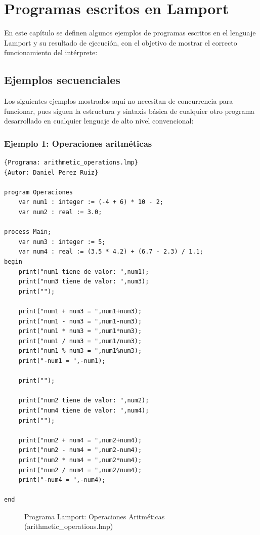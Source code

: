 \chapter{Programas escritos en Lamport}
En este capítulo se definen algunos ejemplos de programas escritos en el lenguaje Lamport y su resultado de ejecución, con el objetivo de mostrar el correcto funcionamiento del intérprete:

\section{Ejemplos secuenciales}
Los siguientes ejemplos mostrados aquí no necesitan de concurrencia para funcionar, pues siguen la estructura y sintaxis básica de cualquier otro programa desarrollado en cualquier lenguaje de alto nivel convencional:

\subsection{Ejemplo 1: Operaciones aritméticas}
\begin{lstlisting}[style=lamportStyle]
{Programa: arithmetic_operations.lmp}
{Autor: Daniel Perez Ruiz}

program Operaciones
	var num1 : integer := (-4 + 6) * 10 - 2;
	var num2 : real := 3.0;

process Main;
	var num3 : integer := 5;
	var num4 : real := (3.5 * 4.2) + (6.7 - 2.3) / 1.1;
begin
	print("num1 tiene de valor: ",num1);
	print("num3 tiene de valor: ",num3);
	print("");
	
	print("num1 + num3 = ",num1+num3);
	print("num1 - num3 = ",num1-num3);
	print("num1 * num3 = ",num1*num3);
	print("num1 / num3 = ",num1/num3);
	print("num1 % num3 = ",num1%num3);
	print("-num1 = ",-num1);
	
	print("");
	
	print("num2 tiene de valor: ",num2);
	print("num4 tiene de valor: ",num4);	
	print("");
	
	print("num2 + num4 = ",num2+num4);
	print("num2 - num4 = ",num2-num4);
	print("num2 * num4 = ",num2*num4);
	print("num2 / num4 = ",num2/num4);
	print("-num4 = ",-num4);
	
end
\end{lstlisting}
\begin{figure}[h]
\caption{Programa Lamport: Operaciones Aritméticas (arithmetic\_operations.lmp)}
\label{fig:lamportArithmeticOperations}
\end{figure}

